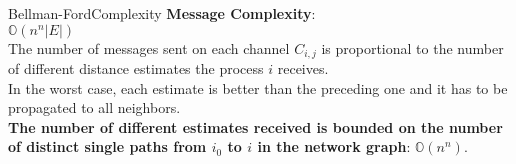 \documentclass[pdf]{beamer}
\begin{document}
\begin{frame}{Bellman-Ford}{Complexity}
    \textbf{Message Complexity}: \\
    \vspace{8pt}
    $\mathbb{O}(n^n |E|)$ \\
    \vspace{8pt}
    \small
    The number of messages sent on each channel $C_{i, j}$ is proportional to the number of different distance estimates the process $i$ receives. \\
    \vspace{8pt}
    In the worst case, each estimate is better than the preceding one and it has to be propagated to all neighbors. \\
    \vspace{8pt}
    \textbf{The number of different estimates received is bounded on the number of distinct single paths from $i_0$ to $i$ in the network graph}: $\mathbb{O}(n^n)$.
\end{frame}
\end{document}
